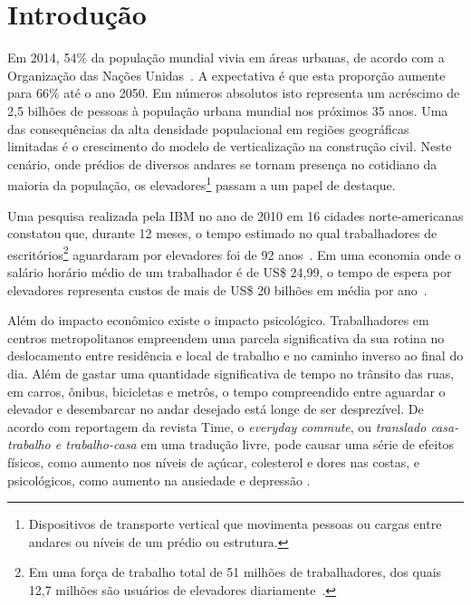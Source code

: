 \chapter{\label{chap:intro}Introdução}


Em 2014, 54\% da população mundial vivia em áreas urbanas, de acordo com a Organização das Nações Unidas~\cite{UN14}. A expectativa é que esta proporção aumente para 66\% até o ano 2050. Em números absolutos isto representa um acréscimo de 2,5 bilhões de pessoas à população urbana mundial nos próximos 35 anos. Uma das consequências da alta densidade populacional em regiões geográficas limitadas é o crescimento do modelo de verticalização na construção civil. Neste cenário, onde prédios de diversos andares se tornam presença no cotidiano da maioria da população, os elevadores\footnote{Dispositivos de transporte vertical que movimenta pessoas ou cargas entre andares ou níveis de um prédio ou estrutura.} passam a um papel de destaque.

Uma pesquisa realizada pela IBM no ano de 2010 em 16 cidades norte-americanas constatou que, durante 12 meses, o tempo estimado no qual trabalhadores de escritórios\footnote{Em uma força de trabalho total de 51 milhões de trabalhadores, dos quais 12,7 milhões são usuários de elevadores diariamente~\cite{IBM10}.} aguardaram por elevadores foi de 92 anos~\cite{IBM10}. Em uma economia onde o salário horário médio de um trabalhador é de US\$ 24,99, o tempo de espera por elevadores representa custos de mais de US\$ 20 bilhões em média por ano~\cite{BLS15}.

Além do impacto econômico existe o impacto psicológico. Trabalhadores em centros metropolitanos empreendem uma parcela significativa da sua rotina no deslocamento entre residência e local de trabalho e no caminho inverso ao final do dia. Além de gastar uma quantidade significativa de tempo no trânsito das ruas, em carros, ônibus, bicicletas e metrôs, o tempo compreendido entre aguardar o elevador e desembarcar no andar desejado está longe de ser desprezível. De acordo com reportagem da revista Time, o \textit{everyday commute}, ou \textit{translado casa-trabalho e trabalho-casa} em uma tradução livre, pode causar uma série de efeitos físicos, como aumento nos níveis de açúcar, colesterol e dores nas costas, e psicológicos, como aumento na ansiedade e depressão \cite{Kylstra14}.

